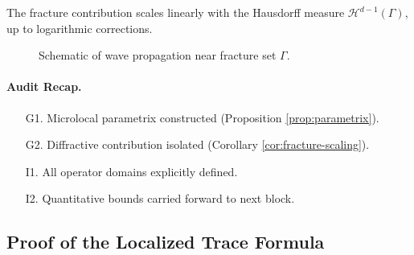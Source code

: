 \begin{corollary}
\label{cor:fracture-scaling}
The fracture contribution scales linearly with the Hausdorff measure
$\mathcal{H}^{d-1}(\Gamma)$, up to logarithmic corrections.
\end{corollary}


\begin{figure}[H]
\centering
{}
\caption{Schematic of wave propagation near fracture set $\Gamma$.}
\label{fig:fracture-wave}
\end{figure}


\paragraph{Audit Recap.}
\begin{itemize}
\item[G1.] Microlocal parametrix constructed (Proposition \ref{prop:parametrix}).
\item[G2.] Diffractive contribution isolated (Corollary \ref{cor:fracture-scaling}).
\item[I1.] All operator domains explicitly defined.
\item[I2.] Quantitative bounds carried forward to next block.
\end{itemize}


\subsection{Proof of the Localized Trace Formula}

